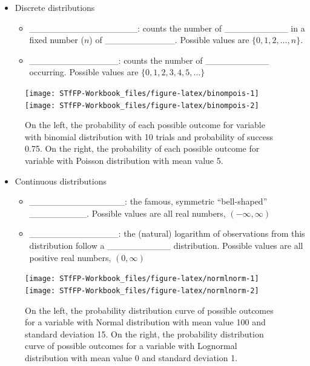 \documentclass[]{book}
\providecommand{\tightlist}{%
  \setlength{\itemsep}{0pt}\setlength{\parskip}{0pt}}
\theoremstyle{definition}
\theoremstyle{definition}
\theoremstyle{remark}
\begin{document}
\begin{itemize}
\tightlist
\item
  Discrete distributions \vspace{.1in}

  \begin{itemize}
  \tightlist
  \item
    \_\_\_\_\_\_\_\_\_\_\_\_\_\_\_\_\_: counts the number of
    \_\_\_\_\_\_\_\_\_\_ in a fixed number (\(n\)) of
    \_\_\_\_\_\_\_\_\_\_\_. Possible values are \(\{0,1,2, \dots, n\}\).
    \vspace{.1in}
  \item
    \_\_\_\_\_\_\_\_\_\_\_\_\_\_: counts the number of
    \_\_\_\_\_\_\_\_\_\_ occurring. Possible values are
    \(\{0,1,2,3,4,5,\dots\}\)
  \end{itemize}
\end{itemize}

\begin{figure}[h]

{\centering \texttt{[image: STfFP-Workbook\_files/figure-latex/binompois-1]} \texttt{[image: STfFP-Workbook\_files/figure-latex/binompois-2]} 

}

\caption{On the left, the probability of each possible outcome for variable with binomial distribution with 10 trials and probability of success 0.75. On the right, the probability of each possible outcome for variable with Poisson distribution with mean value 5.}\label{fig:binompois}
\end{figure}

\begin{itemize}
\tightlist
\item
  Continuous distributions \vspace{.1in}

  \begin{itemize}
  \tightlist
  \item
    \_\_\_\_\_\_\_\_\_\_\_\_\_\_\_: the famous, symmetric
    ``bell-shaped'' \_\_\_\_\_\_\_\_\_. Possible values are all real
    numbers, \((-\infty, \infty)\)
  \item
    \_\_\_\_\_\_\_\_\_\_\_\_\_\_: the (natural) logarithm of
    observations from this distribution follow a \_\_\_\_\_\_\_\_\_\_
    distribution. Possible values are all positive real numbers,
    \((0,\infty)\)
  \end{itemize}
\end{itemize}

\begin{figure}[h]

{\centering \texttt{[image: STfFP-Workbook\_files/figure-latex/normlnorm-1]} \texttt{[image: STfFP-Workbook\_files/figure-latex/normlnorm-2]} 

}

\caption{On the left, the probability distribution curve of possible outcomes for a variable with Normal distribution with mean value 100 and standard deviation 15. On the right, the probability distribution curve of possible outcomes for a variable with Lognormal distribution with mean value 0 and standard deviation 1.}\label{fig:normlnorm}
\end{figure}
\end{document}
